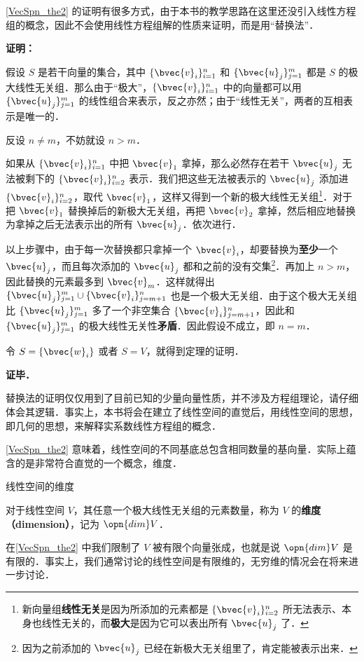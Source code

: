 \autoref{VecSpn_the2} 的证明有很多方式，由于本书的教学思路在这里还没引入线性方程组的概念，因此不会使用线性方程组解的性质来证明，而是用“替换法”．

\textbf{证明：}

假设 $S$ 是若干向量的集合，其中 $\{\bvec{v}_i\}_{i=1}^n$ 和 $\{\bvec{u}_j\}^m_{j=1}$ 都是 $S$ 的极大线性无关组．那么由于“极大”，$\{\bvec{v}_i\}_{i=1}^n$ 中的向量都可以用 $\{\bvec{u}_j\}^m_{j=1}$ 的线性组合来表示，反之亦然；由于“线性无关”，两者的互相表示是唯一的．

反设 $n\not=m$，不妨就设 $n>m$．

如果从 $\{\bvec{v}_i\}_{i=1}^n$ 中把 $\bvec{v}_1$ 拿掉，那么必然存在若干 $\bvec{u}_j$ 无法被剩下的 $\{\bvec{v}_i\}_{i=2}^n$ 表示．我们把这些无法被表示的 $\bvec{u}_j$ 添加进 $\{\bvec{v}_i\}_{i=2}^n$，取代 $\bvec{v}_1$，这样又得到一个新的极大线性无关组\footnote{新向量组\textbf{线性无关}是因为所添加的元素都是 $\{\bvec{v}_i\}_{i=2}^n$ 所无法表示、本身也线性无关的，而\textbf{极大}是因为它可以表出所有 $\bvec{u}_j$ 了．}．对于把 $\bvec{v}_1$ 替换掉后的新极大无关组，再把 $\bvec{v}_2$ 拿掉，然后相应地替换为拿掉之后无法表示出的所有 $\bvec{u}_j$．依次进行．

以上步骤中，由于每一次替换都只拿掉一个 $\bvec{v}_i$，却要替换为\textbf{至少}一个 $\bvec{u}_j$，而且每次添加的 $\bvec{u}_j$ 都和之前的没有交集\footnote{因为之前添加的 $\bvec{u}_j$ 已经在新极大无关组里了，肯定能被表示出来．}．再加上 $n>m$，因此替换的元素最多到 $\bvec{v}_m$．这样就得出 $\{\bvec{u}_j\}^m_{j=1}\cup\{\bvec{v}_i\}^n_{j=m+1}$ 也是一个极大无关组．由于这个极大无关组比 $\{\bvec{u}_j\}^m_{j=1}$ 多了一个非空集合 $\{\bvec{v}_i\}^n_{j=m+1}$，因此和 $\{\bvec{u}_j\}^m_{j=1}$ 的极大线性无关性\textbf{矛盾}．因此假设不成立，即 $n=m$．

令 $S=\{\bvec{w}_i\}$ 或者 $S=V$，就得到定理的证明．

\textbf{证毕．}

替换法的证明仅仅用到了目前已知的少量向量性质，并不涉及方程组理论，请仔细体会其逻辑．事实上，本书将会在建立了线性空间的直觉后，用线性空间的思想，即几何的思想，来解释实系数线性方程组的概念．

\autoref{VecSpn_the2} 意味着，线性空间的不同基底总包含相同数量的基向量．实际上蕴含的是非常符合直觉的一个概念，维度．

\begin{definition}{线性空间的维度}

对于线性空间 $V$，其任意一个极大线性无关组的元素数量，称为 $V$ 的\textbf{维度（dimension）}，记为 $\opn{dim}V$．

\end{definition}

在\autoref{VecSpn_the2} 中我们限制了 $V$ 被有限个向量张成，也就是说 $\opn{dim}V$ 是有限的．事实上，我们通常讨论的线性空间是有限维的，无穷维的情况会在将来进一步讨论．



